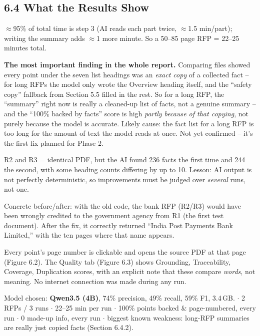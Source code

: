 \documentclass[11pt,a4paper]{article}
\begin{document}
\subsection*{6.4 What the Results Show}
\begin{description}[leftmargin=3.4cm,style=nextline]
  \item[6.4.1 Time Taken] $\approx$95\% of total time is step 3 (AI reads each part twice,
    $\approx$1.5 min/part); writing the summary adds $\approx$1 more minute. So a 50--85 page RFP =
    22--25 minutes total.
  \item[6.4.2 Why Some Scores Look Too Good] \textbf{The most important finding in the whole report.}
    Comparing files showed every point under the seven list headings was an \emph{exact copy} of a
    collected fact -- for long RFPs the model only wrote the Overview heading itself, and the
    ``safety copy'' fallback from Section 5.5 filled in the rest. So for a long RFP, the ``summary''
    right now is really a cleaned-up list of facts, not a genuine summary -- and the ``100\% backed
    by facts'' score is high \emph{partly because of that copying}, not purely because the model is
    accurate. Likely cause: the fact list for a long RFP is too long for the amount of text the
    model reads at once. Not yet confirmed -- it's the first fix planned for Phase 2.
  \item[6.4.3 Same Document, Different Answers] R2 and R3 = identical PDF, but the AI found 236 facts
    the first time and 244 the second, with some heading counts differing by up to 10. Lesson: AI
    output is not perfectly deterministic, so improvements must be judged over \emph{several} runs,
    not one.
  \item[6.4.4 Issuer Detection] Concrete before/after: with the old code, the bank RFP (R2/R3) would
    have been wrongly credited to the government agency from R1 (the first test document). After the
    fix, it correctly returned ``India Post Payments Bank Limited,'' with the ten pages where that
    name appears.
  \item[6.4.5 Checking the Summary] Every point's page number is clickable and opens the source PDF
    at that page (Figure 6.2). The Quality tab (Figure 6.3) shows Grounding, Traceability, Coverage,
    Duplication scores, with an explicit note that these compare \emph{words}, not meaning. No
    internet connection was made during any run.
\end{description}

\begin{keynums}
Model chosen: \textbf{Qwen3.5 (4B)}, 74\% precision, 49\% recall, 59\% F1, 3.4\,GB. $\cdot$
2 RFPs / 3 runs $\cdot$ 22--25 min per run $\cdot$ 100\% points backed \& page-numbered, every run
$\cdot$ 0 made-up info, every run $\cdot$ biggest known weakness: long-RFP summaries are really just
copied facts (Section 6.4.2).
\end{keynums}
\end{document}
